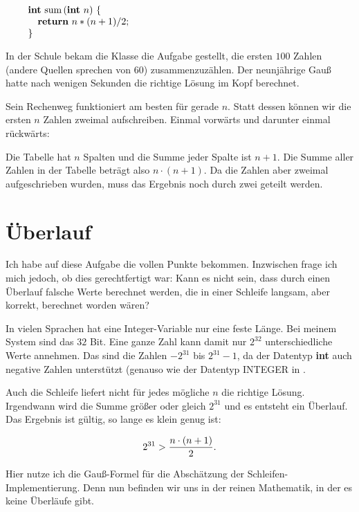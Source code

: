 $$\vbox{\obeylines
{\bf int} sum$\,$({\bf int} $n$) $\{$
\quad {\bf return} $n * (n + 1) / 2$;
$\}$}$$

\noindent In der Schule bekam die Klasse die Aufgabe gestellt, die ersten $100$ Zahlen
(andere Quellen sprechen von $60$) zusammenzuzählen.
Der neunjährige Gauß hatte nach wenigen Sekunden die richtige Lösung im Kopf
berechnet.

Sein Rechenweg funktioniert am besten für gerade $n$.
Statt dessen können wir die ersten $n$ Zahlen zweimal aufschreiben.
Einmal vorwärts und darunter einmal rückwärts:


\noindent Die Tabelle hat $n$ Spalten und die Summe jeder Spalte ist $n+1$.
Die Summe aller Zahlen in der Tabelle beträgt also $n\cdot(n+1)$.
Da die Zahlen aber zweimal aufgeschrieben wurden, muss das
Ergebnis noch durch zwei geteilt werden.

\section{Überlauf}%
%
Ich habe auf diese Aufgabe die vollen Punkte bekommen.
Inzwischen frage ich mich jedoch, ob dies gerechtfertigt war:
Kann es nicht sein, dass durch einen Überlauf falsche Werte
berechnet werden, die in einer Schleife langsam, aber korrekt,
berechnet worden wären?

In vielen Sprachen hat eine Integer-Variable nur eine feste Länge.
Bei meinem System sind das $32$ Bit.
Eine ganze Zahl kann damit nur $2^{32}$ unterschiedliche Werte annehmen.
Das sind die Zahlen $-2^{31}$ bis $2^{31}-1$, da der Datentyp {\bf int}
auch negative Zahlen unterstützt
(genauso wie der Datentyp {\bsf INTEGER}
in \modula.

Auch die Schleife liefert nicht für jedes mögliche $n$ die richtige Lösung.
Irgendwann wird die Summe größer oder gleich $2^{31}$ und es entsteht ein
Überlauf.
Das Ergebnis ist gültig, so lange es klein genug ist:

$$2^{31} > {n\cdot(n + 1)\over 2}\hbox{.}$$

\noindent Hier nutze ich die Gauß-Formel für die Abschätzung der
Schleifen-Implementierung.
Denn nun befinden wir uns in der reinen Mathematik, in der es keine
Überläufe gibt.

